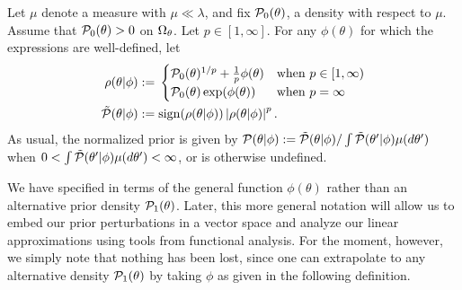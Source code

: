 %
\begin{defn}
%
Let $\mu$ denote a measure with $\mu \ll \lambda$, and fix $\mathcal{P}_{0}(\theta)$, a
density with respect to $\mu$.  Assume that $\mathcal{P}_{0}(\theta) > 0$ on $\Omega_{\theta}$.
Let $p \in [1, \infty]$.  For any $\phi(\theta)$ for which the expressions are
well-defined, let
%
\begin{align*}
%
\rho(\theta \vert \phi) :={}& \begin{cases}
%
\pbase(\theta)^{1/p} + \frac{1}{p}\phi(\theta)
    & \textrm{when }p \in [1, \infty) \\
\pbase(\theta)\exp(\phi(\theta))
    & \textrm{when }p = \infty
%
\end{cases}\\
%
\tilde{\p}(\theta \vert \phi) :={}&
    \mathrm{sign}(\rho(\theta \vert \phi)) \abs{\rho(\theta \vert \phi)}^p.
%
\end{align*}
%
As usual, the normalized prior is given by
$\mathcal{P}(\theta \vert \phi) :=
    \tilde{\mathcal{P}}(\theta \vert \phi) /
         \int \tilde{\mathcal{P}}(\theta' \vert \phi) \mu(d\theta')$
when $0 < \int \tilde{\mathcal{P}}(\theta' \vert \phi) \mu(d\theta') < \infty$,
or is otherwise undefined.
%
\end{defn}
%

We have specified  in terms of the general function
$\phi(\theta)$ rather than an alternative prior density $\mathcal{P}_{1}(\theta)$. Later,
this more general notation will allow us to embed our prior perturbations in a
vector space and analyze our linear approximations using tools from functional
analysis.  For the moment, however, we simply note that nothing has been lost,
since one can extrapolate to any alternative density $\mathcal{P}_{1}(\theta)$ by taking
$\phi$ as given in the following definition.

